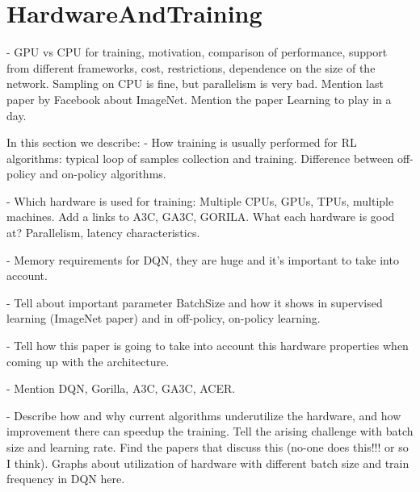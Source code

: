 \section{HardwareAndTraining}


- GPU vs CPU for training, motivation, comparison of performance, support
  from different frameworks, cost, restrictions, dependence on the size of
  the network. Sampling on CPU is fine, but parallelism is very bad.
  Mention last paper by Facebook about ImageNet. Mention the paper Learning
  to play in a day.

In this section we describe:
- How training is usually performed for RL algorithms: typical loop of samples collection
and training. Difference between off-policy and on-policy algorithms.

- Which hardware is used for training: Multiple CPUs, GPUs, TPUs, multiple machines. Add a links to
A3C, GA3C, GORILA. What each hardware is good at? Parallelism, latency characteristics.

- Memory requirements for DQN, they are huge and it's important to take into account.

- Tell about important parameter BatchSize and how it shows in supervised learning (ImageNet paper)
and in off-policy, on-policy learning.

- Tell how this paper is going to take into account this hardware properties when coming up with the
architecture.

- Mention DQN, Gorilla, A3C, GA3C, ACER.

- Describe how and why current algorithms underutilize the hardware, and how
  improvement there can speedup the training. Tell the arising challenge with
  batch size and learning rate. Find the papers that discuss this (no-one does
  this!!! or so I think). Graphs about utilization of hardware with
  different batch size and train frequency in DQN here.
